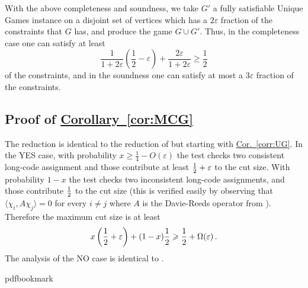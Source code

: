 \documentclass[11pt]{article}
\numberwithin{equation}{section}
\theoremstyle{definition}
\theoremstyle{plain}
\newcommand{\expref}[2]{\hyperref[#2]{#1~\ref{#2}}}
\newcommand\half{{1\over2}}
\newcommand\inner[2]{\langle{#1},{#2}\rangle}
\newcommand\eps{\varepsilon}
\renewcommand\geq{\geqslant}
\begin{document}
With the above completeness and soundness, we take $G'$ a fully satisfiable Unique Games instance on a disjoint set of vertices which
has
a %
$2\eps$ fraction of the constraints that $G$ has, and produce the game $G\cup G'$. Thus, in the completeness case one can
satisfy at least
\[
\frac{1}{1+2\eps}\left(\frac{1}{2}-\eps\right) + \frac{2\eps}{1+2\eps}
\geq \frac{1}{2}
\]
of the constraints, and in the soundness one can satisfy at most
a %
$3\eps$ fraction of the constraints.
\subsection{Proof of \expref{Corollary}{cor:MCG}}\label{sec:pf_of_MCG}
The reduction is identical to the reduction of \cite{KhotOdonell} but starting with
\expref{Cor.}{corr:UG}.  %
In the YES case, with probability $x\geq \frac{1}{4}-O(\eps)$ the test checks two consistent long-code assignment and those contribute at least $\half+\eps$ to the cut size. With probability $1-x$ the test checks two inconsistent long-code assignments,
and those contribute $\half$ to the cut size (this is verified easily by observing that $\inner{\chi_i}{A\chi_j}=0$
for every $i\neq j$ where $A$ is the Davie-Reeds operator from \cite{KhotOdonell}). Therefore the maximum cut size is at least
\[
x\left(\half+\eps\right)+(1-x)\half\geq \half +\Omega(\eps)\,.
\]
The analysis of the NO case is identical to \cite{KhotOdonell}.



\newcommand{\prelim}{Preliminary version in\ }\newcommand{\prelims}{Preliminary
  versions in\ }
\providecommand{\bibhead}[1]{}
\expandafter\ifx\csname pdfbookmark\endcsname\relax%
  \providecommand{\tocrefpdfbookmark}{}
\else\providecommand{\tocrefpdfbookmark}{%
   \hypertarget{tocreferences}{}%
   \pdfbookmark[1]{References}{tocreferences}}%
\fi
\end{document}
